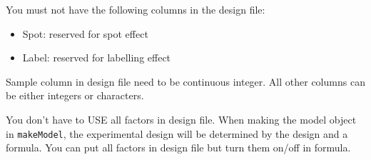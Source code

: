 You must not have the following columns in the design file:
\begin{itemize}
\item Spot: reserved for spot effect
\item Label: reserved for labelling effect
\end{itemize}

Sample column in design file need to be continuous integer. 
All other columns can be either integers or characters. 

You don't have to USE all factors in design file. When making the
model object in {\tt makeModel}, the experimental design will be determined by
the design and a formula. You can put all factors in design file but turn
them on/off in formula. 


